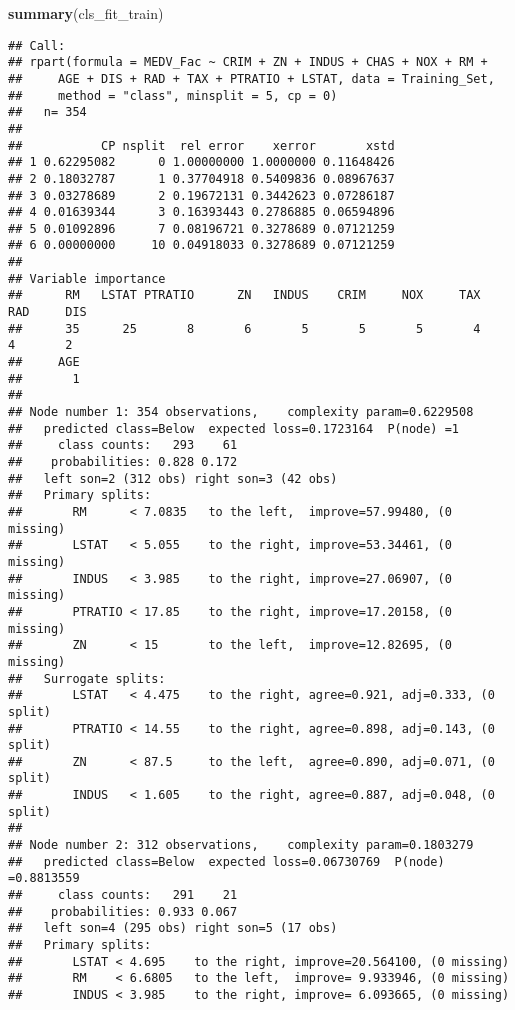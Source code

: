 \documentclass[
]{article}
\newenvironment{Shaded}{\begin{snugshade}}{\end{snugshade}}
\newcommand{\FunctionTok}[1]{\textcolor[rgb]{0.13,0.29,0.53}{\textbf{#1}}}
\newcommand{\NormalTok}[1]{#1}
\begin{document}
\begin{Shaded}
\begin{Highlighting}[]
\FunctionTok{summary}\NormalTok{(cls\_fit\_train)}
\end{Highlighting}
\end{Shaded}

\begin{verbatim}
## Call:
## rpart(formula = MEDV_Fac ~ CRIM + ZN + INDUS + CHAS + NOX + RM + 
##     AGE + DIS + RAD + TAX + PTRATIO + LSTAT, data = Training_Set, 
##     method = "class", minsplit = 5, cp = 0)
##   n= 354 
## 
##           CP nsplit  rel error    xerror       xstd
## 1 0.62295082      0 1.00000000 1.0000000 0.11648426
## 2 0.18032787      1 0.37704918 0.5409836 0.08967637
## 3 0.03278689      2 0.19672131 0.3442623 0.07286187
## 4 0.01639344      3 0.16393443 0.2786885 0.06594896
## 5 0.01092896      7 0.08196721 0.3278689 0.07121259
## 6 0.00000000     10 0.04918033 0.3278689 0.07121259
## 
## Variable importance
##      RM   LSTAT PTRATIO      ZN   INDUS    CRIM     NOX     TAX     RAD     DIS 
##      35      25       8       6       5       5       5       4       4       2 
##     AGE 
##       1 
## 
## Node number 1: 354 observations,    complexity param=0.6229508
##   predicted class=Below  expected loss=0.1723164  P(node) =1
##     class counts:   293    61
##    probabilities: 0.828 0.172 
##   left son=2 (312 obs) right son=3 (42 obs)
##   Primary splits:
##       RM      < 7.0835   to the left,  improve=57.99480, (0 missing)
##       LSTAT   < 5.055    to the right, improve=53.34461, (0 missing)
##       INDUS   < 3.985    to the right, improve=27.06907, (0 missing)
##       PTRATIO < 17.85    to the right, improve=17.20158, (0 missing)
##       ZN      < 15       to the left,  improve=12.82695, (0 missing)
##   Surrogate splits:
##       LSTAT   < 4.475    to the right, agree=0.921, adj=0.333, (0 split)
##       PTRATIO < 14.55    to the right, agree=0.898, adj=0.143, (0 split)
##       ZN      < 87.5     to the left,  agree=0.890, adj=0.071, (0 split)
##       INDUS   < 1.605    to the right, agree=0.887, adj=0.048, (0 split)
## 
## Node number 2: 312 observations,    complexity param=0.1803279
##   predicted class=Below  expected loss=0.06730769  P(node) =0.8813559
##     class counts:   291    21
##    probabilities: 0.933 0.067 
##   left son=4 (295 obs) right son=5 (17 obs)
##   Primary splits:
##       LSTAT < 4.695    to the right, improve=20.564100, (0 missing)
##       RM    < 6.6805   to the left,  improve= 9.933946, (0 missing)
##       INDUS < 3.985    to the right, improve= 6.093665, (0 missing)

\end{verbatim}
\end{document}
